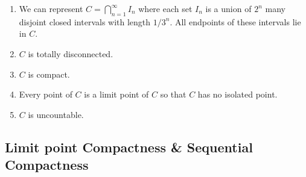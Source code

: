 \documentclass[12pt]{article}
\begin{document}
\begin{itemize}
	\begin{enumerate}
		\item We can represent $C=\bigcap_{n=1}^{\infty}I_n$\; where each set $I_n$ is a union of $2^n$ many disjoint closed intervals with length $1/3^n$. All endpoints of these intervals lie in $C$.
		\item $C$ is totally disconnected.
		\item $C$ is compact.
		\item Every point of $C$ is a limit point of $C$ so that $C$ has no isolated point.
		\item $C$ is uncountable.
	\end{enumerate}   
\end{itemize}
\bigskip

\subsection{Limit point Compactness \& Sequential Compactness}
\smallskip
\end{document}
